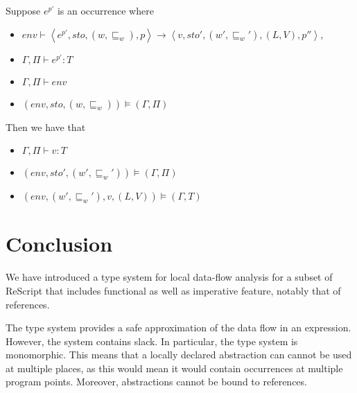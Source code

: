 \documentclass{llncs}
\newcommand{\sqleq}{\ensuremath{\sqsubseteq\xspace}}
\begin{document}
\begin{theorem}[Soundness]
	Suppose $e^{p'}$ is an occurrence where
	\begin{itemize}
		\item $env\vdash\left\langle e^{p'},sto,(w,\sqleq_w),p\right\rangle\rightarrow\left\langle v,sto',(w',\sqleq_w'),(L,V),p''\right\rangle$,
		\item $\Gamma,\Pi\vdash e^{p'} : T$
		\item $\Gamma,\Pi\vdash env$
		\item $(env,sto,(w,\sqleq_w))\models(\Gamma,\Pi)$
	\end{itemize}
	Then we have that
	\begin{itemize}
		\item $\Gamma,\Pi\vdash v:T$
		\item $(env,sto',(w',\sqleq_w'))\models(\Gamma,\Pi)$
		\item $(env,(w',\sqleq_w'),v,(L,V))\models(\Gamma,T)$
	\end{itemize}
\end{theorem}


% 

\section{Conclusion}\label{sec:Conc}

We have introduced a type system for local data-flow analysis for a
subset of ReScript that includes functional as well as imperative
feature, notably that of references.

The type system provides a safe approximation of the data flow in an
expression. However, the system contains slack. In particular, the
type system is monomorphic. This means that a locally declared
abstraction can cannot be used at multiple places, as this would mean
it would contain occurrences at multiple program points. Moreover,
abstractions cannot be bound to references.
\end{document}
